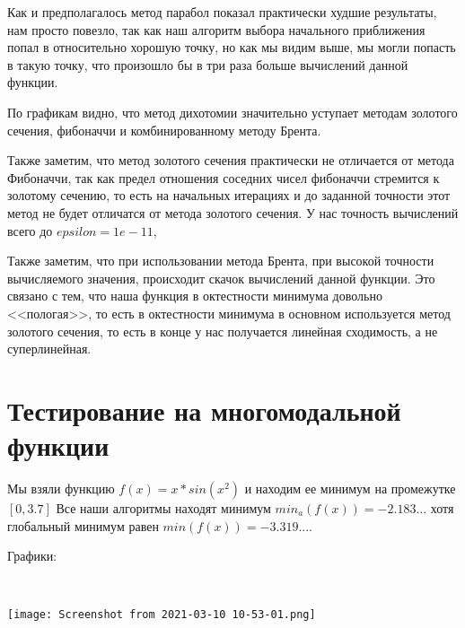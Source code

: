 Как и предполагалось метод парабол показал практически худшие результаты, нам просто повезло, так как
наш алгоритм выбора начального приближения попал в относительно хорошую точку, но как мы видим выше, 
мы могли попасть в такую точку, что произошло бы в три раза больше вычислений данной функции.

По графикам видно, что метод дихотомии значительно уступает
методам золотого сечения, фибоначчи и комбинированному методу Брента.

Также заметим, что метод золотого сечения практически не отличается от метода
Фибоначчи, так как предел отношения соседних чисел фибоначчи стремится к золотому сечению,
то есть на начальных итерациях и до заданной точности этот метод не будет отличатся от 
метода золотого сечения. У нас точность вычислений всего до $epsilon = 1e-11$, 

Также заметим, что при использовании метода Брента, при высокой точности вычисляемого значения, происходит
скачок вычислений данной функции. Это связано с тем, что наша функция в октестности минимума довольно <<пологая>>,
то есть в октестности минимума в основном используется метод золотого сечения, то есть в конце у нас получается
линейная сходимость, а не суперлинейная.

\newpage
\section {Тестирование на многомодальной функции}
Мы взяли функцию 
$f(x) = x * sin(x^2)$
и находим ее минимум на промежутке $[0, 3.7]$
Все наши алгоритмы находят минимум $min_a (f(x)) = -2.183...$
хотя глобальный минимум равен $min(f(x)) = -3.319...$.

Графики:

\ 


\texttt{[image: Screenshot from 2021-03-10 10-53-01.png]}


